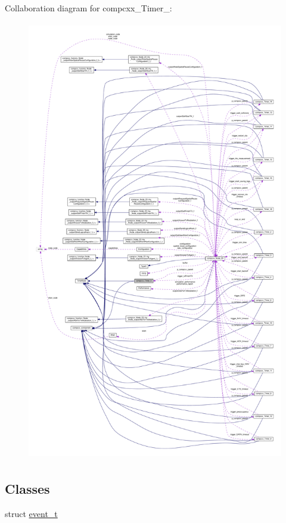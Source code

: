 Collaboration diagram for compcxx\+\_\+\+Timer\+\_\+:\nopagebreak
\begin{figure}[H]
\begin{center}
\leavevmode
\includegraphics[height=550pt]{classcompcxx__Timer__5__coll__graph}
\end{center}
\end{figure}
\subsection*{Classes}
\begin{DoxyCompactItemize}
\item 
struct \hyperlink{structcompcxx__Timer__5_1_1event__t}{event\+\_\+t}
\end{DoxyCompactItemize}
